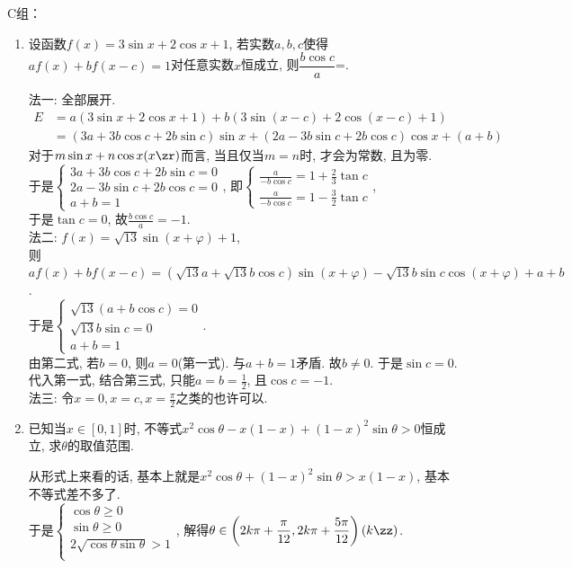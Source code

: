 C组：

\begin{enumerate}

\item 设函数$f(x)=3\sin{x}+2\cos{x}+1$, 若实数$a,b,c$使得$af(x)+bf(x-c)=1$对任意实数$x$恒成立, 则$\dfrac{b\cos{c}}{a}$=. 
\begin{jieda}
法一: 全部展开. 
\begin{align*}
E & = a(3\sin{x}+2\cos{x}+1)+b(3\sin(x-c)+2\cos(x-c)+1)\\
& =(3a+3b\cos{c}+2b\sin{c})\sin{x}+(2a-3b\sin{c}+2b\cos{c})\cos{x}+(a+b)
\end{align*}
对于$m\sin{x}+n\cos{x}(x\zr)$而言, 当且仅当$m=n$时, 才会为常数, 且为零. \\
于是$\begin{cases}
3a+3b\cos{c}+2b\sin{c}=0\\
2a-3b\sin{c}+2b\cos{c}=0\\
a+b=1
\end{cases}$, 
即$\begin{cases}
\frac{a}{-b\cos{c}}=1+\frac{2}{3}\tan{c}\\
\frac{a}{-b\cos{c}}=1-\frac{3}{2}\tan{c}
\end{cases}$, \\
于是$\tan{c}=0$, 故$\frac{b\cos{c}}{a}=-1$. \\
法二: $f(x)=\sqrt{13}\sin(x+\varphi)+1$, \\
则$af(x)+bf(x-c)=(\sqrt{13}a+\sqrt{13}b\cos{c})\sin(x+\varphi)-\sqrt{13}b\sin{c}\cos(x+\varphi)+a+b$. \\
于是$\begin{cases}
\sqrt{13}(a+b\cos{c})=0\\
\sqrt{13}b\sin{c}=0\\
a+b=1
\end{cases}$. \\
由第二式, 若$b=0$, 则$a=0$(第一式). 与$a+b=1$矛盾. 故$b\neq 0$. 于是$\sin{c}=0$. \\
代入第一式, 结合第三式, 只能$a=b=\frac{1}{2}$, 且$\cos{c}=-1$. \\
法三: 令$x=0,x=c,x=\frac{\pi}{2}$之类的也许可以. 
\end{jieda}


\item 已知当$x\in[0,1]$时, 不等式$x^2\cos\theta-x(1-x)+(1-x)^2\sin\theta>0$恒成立, 求$\theta$的取值范围. 
\begin{jieda}
从形式上来看的话, 基本上就是$x^2\cos\theta+(1-x)^2\sin\theta>x(1-x)$, 基本不等式差不多了. \\
于是$\begin{cases}
\cos\theta\geq 0\\
\sin\theta\geq 0\\
2\sqrt{\cos\theta\sin\theta}>1\\
\end{cases}$, 
解得$\theta\in\left(2k\pi+\dfrac{\pi}{12},2k\pi+\dfrac{5\pi}{12}\right)(k\zz)$. 
\end{jieda}

\end{enumerate}




